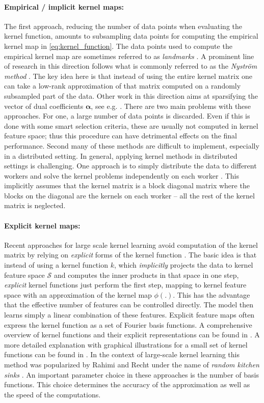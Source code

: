 \documentclass{article} %
\newcommand{\va}{\boldsymbol{\alpha}}
\begin{document}
\paragraph{Empirical / implicit kernel maps:} The first approach, reducing the number of data points when evaluating the kernel function, amounts to subsampling data points for computing the empirical kernel map in \autoref{eq:kernel_function}. 
The data points used to compute the empirical kernel map are sometimes referred to as {\em landmarks} \cite{Hsieh2014}. 
A prominent line of research in this direction follows what is commonly referred to as the {\em Nystr\"om method} \cite{Williams2000}. The key idea here is that instead of using the entire kernel matrix one can take a low-rank approximation of that matrix computed on a randomly subsampled part of the data. 
Other work in this direction aims at sparsifying the vector of dual coefficients $\va$, see e.g. \cite{WilsonN15, LiangP15}. 
There are two main problems with these approaches. For one, a large number of data points is discarded. Even if this is done with some smart selection criteria, these are usually not computed in kernel feature space; thus this procedure can have detrimental effects on the final performance. Second many of these methods are difficult to implement, especially in a distributed setting. In general, applying kernel methods in distributed settings is challenging. One approach is to simply distribute the data to different workers and solve the kernel problems independently on each worker \cite{Deisenroth2015}. This implicitly assumes that the kernel matrix is a block diagonal matrix where the blocks on the diagonal are the kernels on each worker -- all the rest of the kernel matrix is neglected.

\paragraph{Explicit kernel maps:} Recent approaches for large scale kernel learning avoid computation of the kernel matrix by relying on {\em explicit} forms of the kernel function \cite{Rahimi2008,Vedaldi2010}. The basic idea is that instead of using a kernel function $k$, which {\em implicitly} projects the data to kernel feature space $\mathcal{S}$ and computes the inner products in that space in one step, {\em explicit} kernel functions just perform the first step, mapping to kernel feature space with an approximation of the kernel map $\phi(.)$. This has the advantage that the effective number of features can be controlled directly. The model then learns simply a linear combination of these features. Explicit feature maps often express the kernel function as a set of Fourier basis functions. A comprehensive overview of kernel functions and their explicit representations can be found in \cite{Dai2014}. A more detailed explanation with graphical illustrations for a small set of kernel functions can be found in \cite{Vedaldi2010}. In the context of large-scale kernel learning this method was popularized by Rahimi and Recht under the name of {\em random kitchen sinks} \cite{Rahimi2008}. An important parameter choice in these approaches is the number of basis functions. This choice determines the accuracy of the approximation as well as the speed of the computations. 
\end{document}
